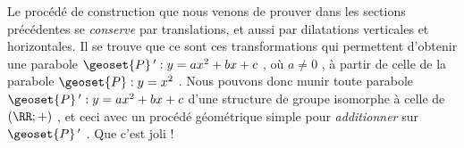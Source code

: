 Le procédé de construction que nous venons de prouver dans les sections précédentes se \emph{\og conserve \fg} par translations, et aussi par dilatations verticales et horizontales.
Il se trouve que ce sont ces transformations qui permettent d'obtenir une parabole $\geoset{P}\,^\prime : y = a x^2 + b x + c$ , où $a \neq 0$ , à partir de celle de la parabole $\geoset{P} : y = x^2$ .
Nous pouvons donc munir toute parabole $\geoset{P}\,^\prime : y = a x^2 + b x + c$ d'une structure de groupe isomorphe à celle de $(\RR ; +)$ , et ceci avec un procédé géométrique simple pour \emph{\og additionner \fg} sur $\geoset{P}\,^\prime$ . Que c'est joli !
